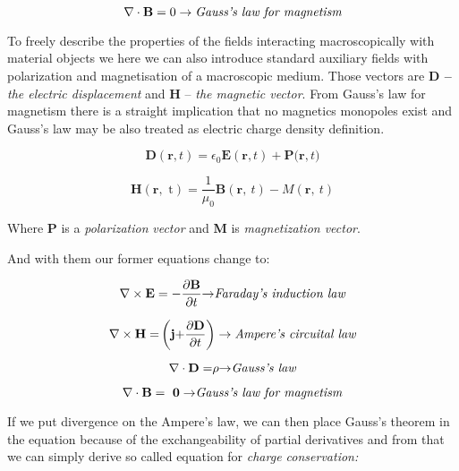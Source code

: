 \begin{equation}
\nabla \cdot \mathbf{B} =  0 \rightarrow \emph{Gauss's law for
magnetism}
\end{equation}

To freely describe the properties of the fields interacting
macroscopically with material objects we here we can also introduce
standard auxiliary fields with polarization and magnetisation of a
macroscopic medium. Those vectors are \textbf{D --} \emph{the electric
displacement} and \textbf{H} -- \emph{the magnetic vector}. From Gauss's
law for magnetism there is a straight implication that no magnetics
monopoles exist and Gauss's law may be also treated as electric charge
density definition.

\begin{equation}
\mathbf{D}\left( \mathbf{r,}t \right) = \epsilon_{0}\mathbf{E}\left( \mathbf{r,}t \right) + \mathbf{P(r,}t)
\end{equation}

\begin{equation}
\mathbf{H}\left( \mathbf{r,}\text{\ t} \right) = \frac{1}{\mu_{0}}\mathbf{B}\left( \mathbf{r,\ }t \right) - M(\mathbf{r,\ }t)
\end{equation}

\noindent Where \textbf{P} is a \emph{polarization} \emph{vector} and \textbf{M}
is \emph{magnetization vector}.

\noindent And with them our former equations change to:

\begin{equation}
\nabla \times \mathbf{E} = -\frac{\partial\mathbf{B}}{\partial t}\mathbf{\rightarrow}
\emph{Faraday's induction law}
\label{Faraday}
\end{equation}

\begin{equation}
\nabla \times \mathbf{H =}\left( \mathbf{j +}\frac{\partial\mathbf{D}}{\partial t} \right) \rightarrow
\emph{Ampere's circuital law}
\label{Ampere}
\end{equation}

\begin{equation}
\nabla \cdot \mathbf{D =}\rho\mathbf{\rightarrow} \emph{Gauss's
law}
\end{equation}

\begin{equation}
\nabla \cdot \mathbf{B = \ 0 \rightarrow} \emph{Gauss's law for
magnetism}
\end{equation}

If we put divergence on the Ampere's law, we can then place Gauss's
theorem in the equation because of the exchangeability of partial
derivatives and from that we can simply derive so called equation for
\emph{charge conservation:}

